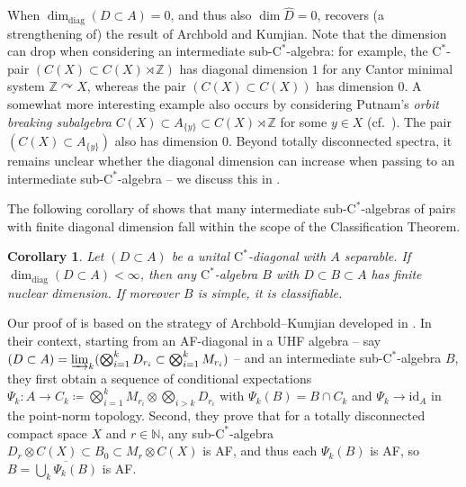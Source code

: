 \documentclass[11pt,a4paper]{amsart}
\newcounter{theoremintro}
\newtheorem{corollaryi}[theoremintro]{Corollary}
\theoremstyle{definition}
\numberwithin{equation}{section}
\newcommand{\bb}[1]{\mathbb{#1}}
\def\acts{\curvearrowright}
\begin{document}
When $\dim_{\mathrm{diag}}(D\subset A)=0$, and thus also $\dim\widehat{D}=0$,  recovers (a strengthening of) the result of Archbold and Kumjian. Note that the dimension can drop when considering an intermediate sub-$\mathrm{C}^\ast$-algebra: for example, the $\mathrm{C}^\ast$-pair $(C(X)\subset C(X)\rtimes\bb{Z})$ has diagonal dimension $1$ for any Cantor minimal system $\bb{Z}\acts X$, whereas the pair $(C(X)\subset C(X))$ has dimension $0$. A somewhat more interesting example also occurs by considering Putnam's \emph{orbit breaking subalgebra} $C(X)\subset A_{\{y\}}\subset C(X)\rtimes\bb{Z}$ for some $y\in X$ (cf.\ \cite{Putnam89, DeeleyPutnamStrung24}). The pair $(C(X)\subset A_{\{y\}})$ also has dimension $0$. Beyond totally disconnected spectra, it remains unclear whether the diagonal dimension can increase when passing to an intermediate sub-$\mathrm{C}^\ast$-algebra -- we discuss this in . 

The following corollary of  shows that many intermediate sub-$\mathrm{C}^\ast$-algebras of pairs with finite diagonal dimension fall within the scope of the Classification Theorem.

\begin{corollaryi}\label{cori:B}
Let $(D\subset A)$ be a unital $\mathrm{C}^\ast$-diagonal with $A$ separable. If $\dim_\mathrm{diag}(D\subset A)<\infty $, then any  $\mathrm{C}^\ast$-algebra $B$ with $D\subset B\subset A$ has finite nuclear dimension. If moreover $B$ is simple, it is classifiable.
\end{corollaryi}


Our proof of  is based on the strategy of Archbold--Kumjian developed in \cite{ArcKum86}. In their context, starting from an AF-diagonal in a UHF algebra -- say $(D\subset A)=\varinjlim_k(\bigotimes_{i=1}^kD_{r_i}\subset \bigotimes_{i=1}^kM_{r_i})$ -- and an intermediate sub-$\mathrm{C}^\ast$-algebra $B$, they first obtain a sequence of conditional expectations $\Psi_k\colon A\to C_k\coloneqq \bigotimes_{i=1}^kM_{r_i}\otimes \bigotimes_{i>k}D_{r_i}$ with $\Psi_k(B) = B\cap C_k$ and $\Psi_k\to\mathrm{id}_A$ in the point-norm topology. Second, they prove that for a totally disconnected compact space $X$ and $r\in\bb{N}$, any sub-$\mathrm{C}^\ast$-algebra $D_r\otimes C(X) \subset B_0\subset M_r\otimes C(X)$ is AF, and thus each $\Psi_k(B)$ is AF, so $B=\overline{\bigcup_k\Psi_k(B)}$ is AF. 
\end{document}
